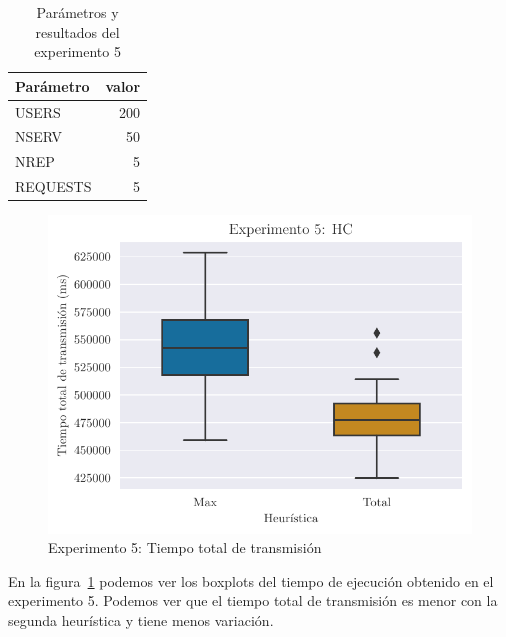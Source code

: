 \begin{table}[H]
    \caption{Parámetros y resultados del experimento 5}%
    \label{tab:ex5}
    \begin{center}
    \begin{tabular}{lr}
    \toprule
    Parámetro & valor \\
    \midrule
    USERS & 200 \\
    NSERV & 50 \\
    NREP & 5 \\
    REQUESTS & 5\\
    \bottomrule
    \end{tabular}
    \hspace{2em}
    
    \end{center}
\end{table}

\begin{figure}[H]
    \centering
    \includegraphics{include/plots/ex5_ttt_bplot.pdf}
    \caption{Experimento 5: Tiempo total de transmisión}%
    \label{fig:ex5ttt}
\end{figure}

En la figura~\ref{fig:ex5ttt} podemos ver los boxplots del tiempo de ejecución obtenido en el experimento 5.
Podemos ver que el tiempo total de transmisión es menor con la segunda heurística y tiene menos variación.

